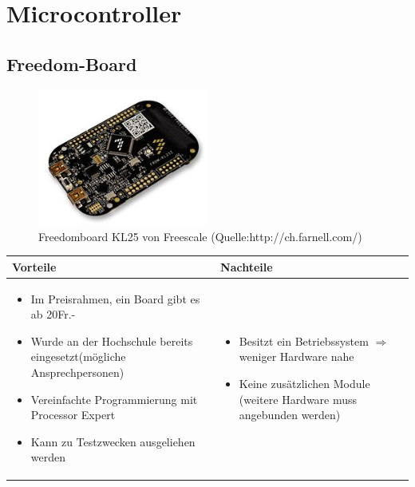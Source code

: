 
\section{Microcontroller}


\subsection{Freedom-Board}
\begin{figure}[h]
	\centering
	\includegraphics[width=0.5\textwidth]{fig/freedomboard.png}
	\caption{Freedomboard KL25 von Freescale (Quelle:http://ch.farnell.com/)}
\end{figure}


\begin{table}[h]
\begin{tabular}{p{} | p{}}


 \textbf{Vorteile} & \textbf{Nachteile} \\ \hline
	 
\begin{itemize}
\item Im Preisrahmen, ein Board gibt es ab 20Fr.-
\item Wurde an der Hochschule bereits eingesetzt(mögliche Ansprechpersonen)
\item Vereinfachte Programmierung mit Processor Expert
\item Kann zu Testzwecken ausgeliehen werden
\end{itemize}

 &
 
\begin{itemize}
\item Besitzt ein Betriebssystem $\Rightarrow$ weniger Hardware nahe
\item Keine zusätzlichen Module (weitere Hardware muss angebunden werden)
\end{itemize}

\end{tabular}
\end{table}

